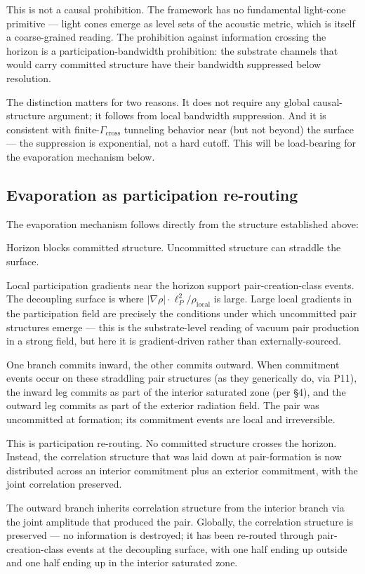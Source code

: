 \documentclass[11pt,a4paper]{article}
\begin{document}
This is not a causal prohibition. The framework has no fundamental light-cone primitive --- light cones emerge as level sets of the acoustic metric, which is itself a coarse-grained reading. The prohibition against information crossing the horizon is a participation-bandwidth prohibition: the substrate channels that would carry committed structure have their bandwidth suppressed below resolution.

The distinction matters for two reasons. It does not require any global causal-structure argument; it follows from local bandwidth suppression. And it is consistent with finite-$\Gamma_{\mathrm{cross}}$ tunneling behavior near (but not beyond) the surface --- the suppression is exponential, not a hard cutoff. This will be load-bearing for the evaporation mechanism below.

\subsection{Evaporation as participation re-routing}

The evaporation mechanism follows directly from the structure established above:

Horizon blocks committed structure. Uncommitted structure can straddle the surface.

Local participation gradients near the horizon support pair-creation-class events. The decoupling surface is where $|\nabla\rho|\cdot\ell_P^2/\rho_{\mathrm{local}}$ is large. Large local gradients in the participation field are precisely the conditions under which uncommitted pair structures emerge --- this is the substrate-level reading of vacuum pair production in a strong field, but here it is gradient-driven rather than externally-sourced.

One branch commits inward, the other commits outward. When commitment events occur on these straddling pair structures (as they generically do, via P11), the inward leg commits as part of the interior saturated zone (per \S4), and the outward leg commits as part of the exterior radiation field. The pair was uncommitted at formation; its commitment events are local and irreversible.

This is participation re-routing. No committed structure crosses the horizon. Instead, the correlation structure that was laid down at pair-formation is now distributed across an interior commitment plus an exterior commitment, with the joint correlation preserved.

The outward branch inherits correlation structure from the interior branch via the joint amplitude that produced the pair. Globally, the correlation structure is preserved --- no information is destroyed; it has been re-routed through pair-creation-class events at the decoupling surface, with one half ending up outside and one half ending up in the interior saturated zone.
\end{document}
